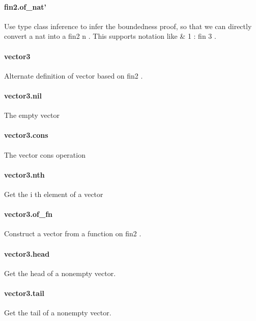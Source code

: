 \documentclass{article}
\begin{document}
\paragraph{fin2.of\_nat'}
\par
Use type class inference to infer the boundedness proof, so that we
can directly convert a 
\colorbox[RGB]{253,246,227}{{{{\color[RGB]{101, 123, 131} nat }}}} into a 
\colorbox[RGB]{253,246,227}{{{{\color[RGB]{101, 123, 131} fin2 n }}}}. This supports
notation like 
\colorbox[RGB]{253,246,227}{{{{\color[RGB]{101, 123, 131} \& }}}{{{\color[RGB]{108, 113, 196} 1 }}}{{{\color[RGB]{101, 123, 131}  : fin  }}}{{{\color[RGB]{108, 113, 196} 3 }}}}.
\paragraph{vector3}
\par
Alternate definition of 
\colorbox[RGB]{253,246,227}{{{{\color[RGB]{101, 123, 131} vector }}}} based on 
\colorbox[RGB]{253,246,227}{{{{\color[RGB]{101, 123, 131} fin2 }}}}.
\paragraph{vector3.nil}
\par
The empty vector
\paragraph{vector3.cons}
\par
The vector cons operation
\paragraph{vector3.nth}
\par
Get the 
\colorbox[RGB]{253,246,227}{{{{\color[RGB]{101, 123, 131} i }}}}th element of a vector
\paragraph{vector3.of\_fn}
\par
Construct a vector from a function on 
\colorbox[RGB]{253,246,227}{{{{\color[RGB]{101, 123, 131} fin2 }}}}.
\paragraph{vector3.head}
\par
Get the head of a nonempty vector.
\paragraph{vector3.tail}
\par
Get the tail of a nonempty vector.
\end{document}
